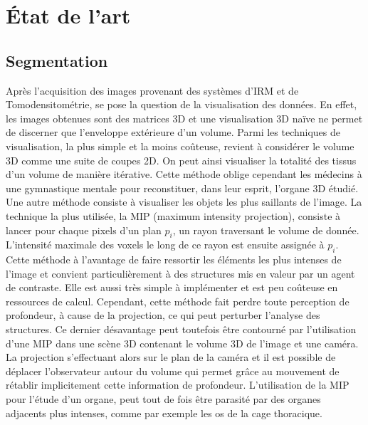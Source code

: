 %
\chapter{État de l'art}



\section{Segmentation}
\label{sec:EA:segmentation}


Après l'acquisition des images provenant des systèmes d'IRM et de Tomodensitométrie, se pose la question de la visualisation des données. En effet, les images obtenues sont des matrices 3D et une visualisation 3D naïve ne permet de discerner que l'enveloppe extérieure d'un volume. Parmi les techniques de visualisation, la plus simple et la moins coûteuse, revient à considérer le volume 3D comme une suite de coupes 2D. On peut ainsi visualiser la totalité des tissus d'un volume de manière itérative. Cette méthode oblige cependant les médecins à une gymnastique mentale pour reconstituer, dans leur esprit, l'organe 3D étudié. Une autre méthode consiste à visualiser les objets les plus saillants de l'image. La technique la plus utilisée, la MIP (maximum intensity projection), consiste à lancer pour chaque pixels d'un plan $p_i$, un rayon traversant le volume de donnée. L'intensité maximale des voxels le long de ce rayon est ensuite assignée à $p_i$. Cette méthode à l'avantage de faire ressortir les éléments les plus intenses de l'image et convient particulièrement à des structures mis en valeur par un agent de contraste. Elle est aussi très simple à implémenter et est peu coûteuse en ressources de calcul. Cependant, cette méthode fait perdre toute perception de profondeur, à cause de la projection, ce qui peut perturber l'analyse des structures. Ce dernier désavantage peut toutefois être contourné par l'utilisation d'une MIP dans une scène 3D contenant le volume 3D de l'image et une caméra. La projection s'effectuant alors sur le plan de la caméra et il est possible de déplacer l'observateur autour du volume qui permet grâce au mouvement de rétablir implicitement cette information de profondeur. L'utilisation de la MIP pour l'étude d'un organe, peut tout de fois être parasité par des organes adjacents plus intenses, comme par exemple les os de la cage thoracique.

